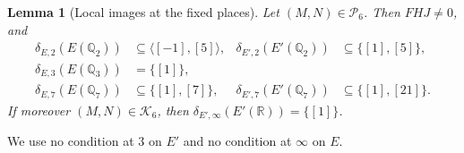\documentclass[12pt,oneside,openany]{book}
\theoremstyle{definition}
\theoremstyle{plain}
\numberwithin{equation}{chapter}
\theoremstyle{plain}
\newtheorem{lemma}[lemma]{Lemma}
\theoremstyle{definition}
\theoremstyle{remark}
\newcommand{\Q}{\mathbb Q}
\newcommand{\R}{\mathbb R}
\newcommand{\sq}[1]{[#1]}
\newcommand{\cP}{\mathcal P}
\newcommand{\cK}{\mathcal K}
\begin{document}
\begin{lemma}[Local images at the fixed places]\label{lem:r6-fixed}
Let $(M,N)\in\cP_6$. Then $FHJ\ne0$, and
\[
\begin{aligned}
\delta_{E,2}(E(\Q_2))&\subseteq\langle\sq{-1},\sq5\rangle, & \delta_{E',2}(E'(\Q_2))&\subseteq\{\sq1,\sq5\},\\
\delta_{E,3}(E(\Q_3))&=\{\sq1\}, & &\\
\delta_{E,7}(E(\Q_7))&\subseteq\{\sq1,\sq7\}, & \delta_{E',7}(E'(\Q_7))&\subseteq\{\sq1,\sq{21}\}.
\end{aligned}
\]
If moreover $(M,N)\in\cK_6$, then $\delta_{E',\infty}(E'(\R))=\{\sq1\}$.
\end{lemma}

We use no condition at $3$ on $E'$ and no condition at $\infty$ on $E$.
\end{document}
